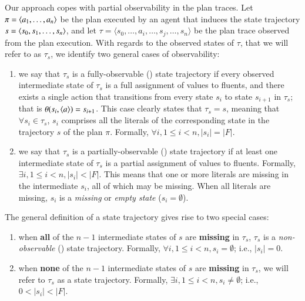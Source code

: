 Our approach copes with partial observability in the plan traces. Let $\pi={\langle a_1, \ldots, a_n \rangle}$ be the plan executed by an agent that induces the state trajectory $s={\langle s_0, s_1, \ldots, s_n \rangle}$, and let $\tau = \langle s_0, \ldots, a_i, \ldots, s_j, \ldots, s_n \rangle$ be the plan trace observed from the plan execution. With regards to the observed states of $\tau$, that we will refer to as $\tau_s$, we identify two general cases of observability:

\begin{enumerate}
\item we say that $\tau_s$ is a fully-observable (\FO) state trajectory if every observed intermediate state of $\tau_s$ is a full assignment of values to fluents, and \textcolor[rgb]{1.00,0.00,0.00}{there exists a single action that transitions from every state $s_i$ to state $s_{i+1}$ in $\tau_s$};  that is $\theta(s_i,{\langle a \rangle})=s_{i+1}$. \textcolor[rgb]{1.00,0.00,0.00}{This case clearly states that $\tau_s = s$, meaning that $\forall s_i \in \tau_s$, $s_i$ comprises all the literals of the corresponding state in the trajectory $s$ of the plan $\pi$. Formally, $\forall i, 1 \leq i  < n, |s_i| = |F|$.}
\item we say that $\tau_s$ is a partially-observable (\PO) state trajectory if at least one intermediate state of $\tau_s$ is a partial assignment of values to fluents. \textcolor[rgb]{1.00,0.00,0.00}{Formally, $\exists i, 1 \leq i  < n, |s_i| < |F|$.} This means that one or more literals are missing in the intermediate $s_i$, all of which may be missing. When all literals are missing, $s_i$ is a \emph{missing} or \emph{empty state} ($s_i = \emptyset$).
\end{enumerate}

The general definition of a \PO state trajectory gives rise to two special cases:

\begin{enumerate}
\item when \textbf{all} of the $n-1$ intermediate states of $s$ are \textbf{missing} in $\tau_s$, $\tau_s$ is a \emph{non-observable} (\NO) state trajectory. \textcolor[rgb]{1.00,0.00,0.00}{Formally, $\forall i, 1 \leq i < n,  s_i= \emptyset$; i.e., $|s_i| = 0$.}
\item when \textbf{none} of the $n-1$ intermediate states of $s$ are \textbf{missing} in $\tau_s$, we will refer to $\tau_s$ as a \POstar state trajectory. \textcolor[rgb]{1.00,0.00,0.00}{Formally, $\exists i, 1 \leq i < n, s_i \neq \emptyset$; i.e., $0 < |s_i| < |F|$.}
\end{enumerate}

